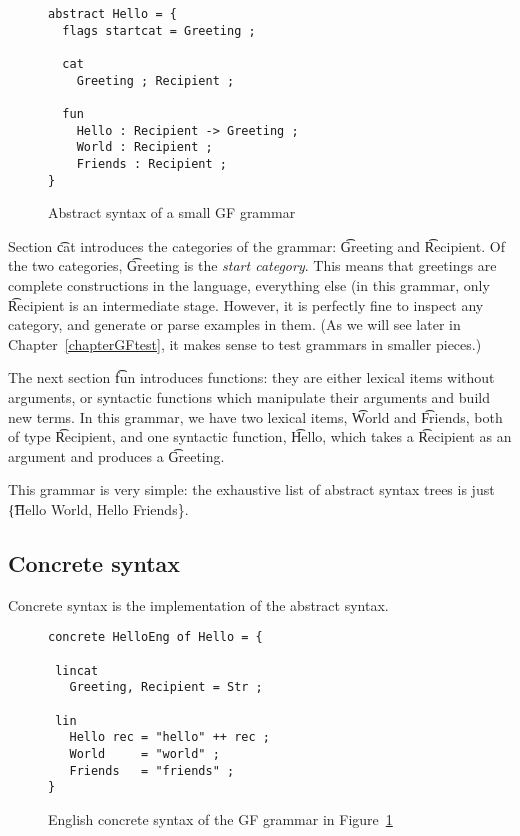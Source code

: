 \begin{figure}[h]
  \centering
\begin{verbatim}
abstract Hello = {
  flags startcat = Greeting ;

  cat 
    Greeting ; Recipient ;

  fun
    Hello : Recipient -> Greeting ;
    World : Recipient ;
    Friends : Recipient ; 
}

\end{verbatim}
\caption{Abstract syntax of a small GF grammar}
\label{fig:abstract_syntax}
\end{figure}

Section \t{cat} introduces the categories of the grammar:
\t{Greeting} and \t{Recipient}. 
Of the two categories, \t{Greeting} is the \emph{start category}.
This means that greetings are complete constructions in the language,
everything else (in this grammar, only \t{Recipient} is an
intermediate stage. However, it is perfectly fine to inspect any
category, and generate or parse examples in them. (As we will see later
in Chapter~\ref{chapterGFtest}, it makes sense to test grammars in
smaller pieces.)

The next section \t{fun} introduces functions: they are either lexical
items without arguments, or syntactic functions which manipulate their
arguments and build new terms. In this grammar, we have two lexical
items, \t{World} and \t{Friends}, both of type \t{Recipient}, and one
syntactic function, \t{Hello}, which takes a \t{Recipient} as an
argument and produces a \t{Greeting}. 

This grammar is very simple: the exhaustive list of abstract syntax
trees  is just \t{\{Hello World, Hello Friends\}}.


\subsection{Concrete syntax}

Concrete syntax is the implementation of the abstract syntax.

\begin{figure}[h]
  \centering
\begin{verbatim}
concrete HelloEng of Hello = {

 lincat 
   Greeting, Recipient = Str ;

 lin
   Hello rec = "hello" ++ rec ;
   World     = "world" ;
   Friends   = "friends" ;
}
\end{verbatim}
\caption{English concrete syntax of the GF grammar in Figure~\ref{fig:abstract_syntax}}
\label{fig:concrete_syntax_eng}
\end{figure}

